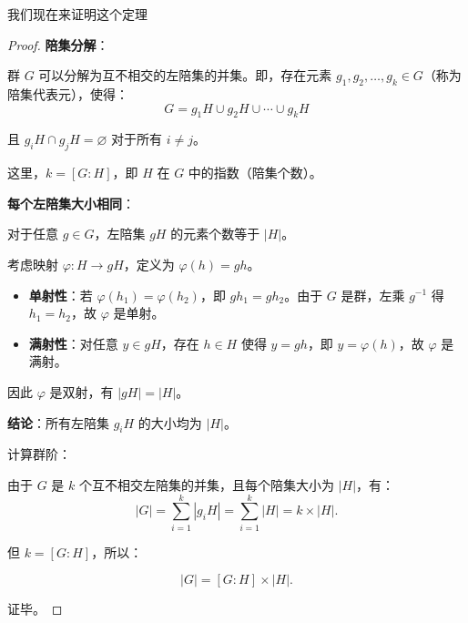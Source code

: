 \documentclass{ctexart}%
\begin{document}
我们现在来证明这个定理
\begin{proof}
    \textbf{陪集分解}：

    群 $G$ 可以分解为互不相交的左陪集的并集。即，存在元素 $g_1, g_2, \ldots, g_k \in G$（称为陪集代表元），使得：
    \[
        G = g_1 H \cup g_2 H \cup \cdots \cup g_k H
    \]

    且 $g_i H \cap g_j H = \varnothing$ 对于所有 $i \neq j$。

    这里，$k = [G : H]$，即 $H$ 在 $G$ 中的指数（陪集个数）。

    \textbf{每个左陪集大小相同}：

    对于任意 $g \in G$，左陪集 $gH$ 的元素个数等于 $|H|$。

    考虑映射 $\varphi: H \to gH$，定义为 $\varphi(h) = gh$。

    \begin{itemize}
        \item \textbf{单射性}：若 $\varphi(h_1) = \varphi(h_2)$，即 $gh_1 = gh_2$。由于 $G$ 是群，左乘 $g^{-1}$ 得 $h_1 = h_2$，故 $\varphi$ 是单射。
        \item \textbf{满射性}：对任意 $y \in gH$，存在 $h \in H$ 使得 $y = gh$，即 $y = \varphi(h)$，故 $\varphi$ 是满射。
    \end{itemize}

    因此 $\varphi$ 是双射，有 $|gH| = |H|$。

    \textbf{结论}：所有左陪集 $g_i H$ 的大小均为 $|H|$。

计算群阶：

由于 $G$ 是 $k$ 个互不相交左陪集的并集，且每个陪集大小为 $|H|$，有：
\[
|G| = \sum_{i=1}^k |g_i H| = \sum_{i=1}^k |H| = k \times |H|.
\]

但 $k = [G:H]$，所以：

\[
|G| = [G:H] \times |H|.
\]

证毕。
\end{proof}
\end{document}
